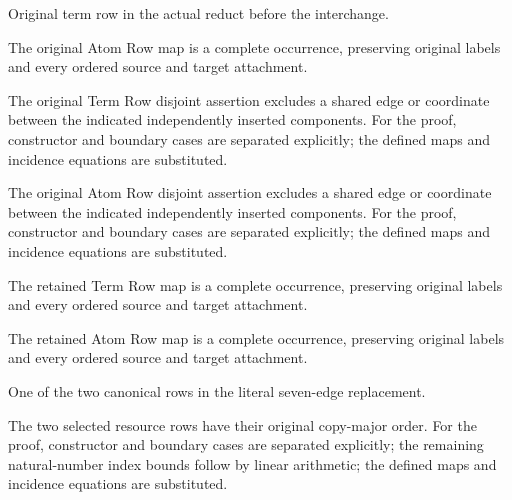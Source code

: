 Original term row in the actual reduct before the interchange.
\par{}

The original Atom Row map is a complete occurrence, preserving original labels and every ordered source and target attachment.
\par{}

The original Term Row disjoint assertion excludes a shared edge or coordinate between the indicated independently inserted components.
For the proof, constructor and boundary cases are separated explicitly; the defined maps and incidence equations are substituted.
\par{}

The original Atom Row disjoint assertion excludes a shared edge or coordinate between the indicated independently inserted components.
For the proof, constructor and boundary cases are separated explicitly; the defined maps and incidence equations are substituted.
\par{}

The retained Term Row map is a complete occurrence, preserving original labels and every ordered source and target attachment.
\par{}

The retained Atom Row map is a complete occurrence, preserving original labels and every ordered source and target attachment.
\par{}

One of the two canonical rows in the literal seven-edge replacement.
\par{}

The two selected resource rows have their original copy-major order.
For the proof, constructor and boundary cases are separated explicitly; the remaining natural-number index bounds follow by linear arithmetic; the defined maps and incidence equations are substituted.
\par{}

